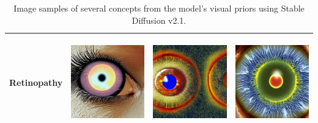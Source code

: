 \begin{table}[H]
\begin{tabularx}{\linewidth}{@{}>{\centering\arraybackslash}m{3cm}>{\centering\arraybackslash}X>{\centering\arraybackslash}X>{\centering\arraybackslash}X@{}}
Retinopathy & \includegraphics[valign=M,width=\linewidth,height=4cm,keepaspectratio]{main/content/images/prior_concepts_sd/v2/retinopathy/retinopathy-0.jpg} & \includegraphics[valign=M,width=\linewidth,height=4cm,keepaspectratio]{main/content/images/prior_concepts_sd/v2/retinopathy/retinopathy-1.jpg} & \includegraphics[valign=M,width=\linewidth,height=4cm,keepaspectratio]{main/content/images/prior_concepts_sd/v2/retinopathy/retinopathy-2.jpg} \\
\bottomrule
\end{tabularx}
\caption{Image samples of several concepts from the model's visual priors using Stable Diffusion v2.1.}
\label{tab:sample_images_priors_sd2}
\end{table}